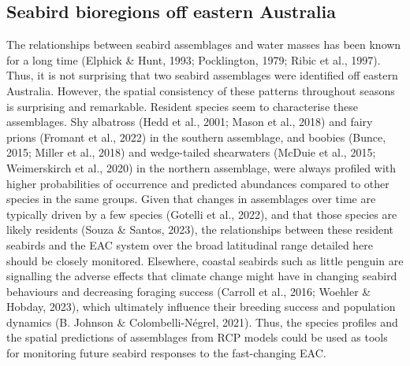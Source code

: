 \documentclass{article}
\begin{document}
\hypertarget{seabird-bioregions-off-eastern-australia}{%
\subsection{Seabird bioregions off eastern Australia}\label{seabird-bioregions-off-eastern-australia}}

The relationships between seabird assemblages and water masses has been known for a long time (Elphick \& Hunt, 1993; Pocklington, 1979; Ribic et al., 1997). Thus, it is not surprising that two seabird assemblages were identified off eastern Australia. However, the spatial consistency of these patterns throughout seasons is surprising and remarkable. Resident species seem to characterise these assemblages. Shy albatross (Hedd et al., 2001; Mason et al., 2018) and fairy prions (Fromant et al., 2022) in the southern assemblage, and boobies (Bunce, 2015; Miller et al., 2018) and wedge-tailed shearwaters (McDuie et al., 2015; Weimerskirch et al., 2020) in the northern assemblage, were always profiled with higher probabilities of occurrence and predicted abundances compared to other species in the same groups. Given that changes in assemblages over time are typically driven by a few species (Gotelli et al., 2022), and that those species are likely residents (Souza \& Santos, 2023), the relationships between these resident seabirds and the EAC system over the broad latitudinal range detailed here should be closely monitored. Elsewhere, coastal seabirds such as little penguin are signalling the adverse effects that climate change might have in changing seabird behaviours and decreasing foraging success (Carroll et al., 2016; Woehler \& Hobday, 2023), which ultimately influence their breeding success and population dynamics (B. Johnson \& Colombelli-Négrel, 2021). Thus, the species profiles and the spatial predictions of assemblages from RCP models could be used as tools for monitoring future seabird responses to the fast-changing EAC.
\end{document}
